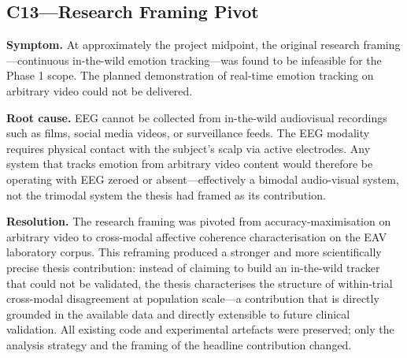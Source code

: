 \subsection*{C13---Research Framing Pivot}
\textbf{Symptom.} At approximately the project midpoint, the original research framing---continuous in-the-wild emotion tracking---was found to be infeasible for the Phase 1 scope. The planned demonstration of real-time emotion tracking on arbitrary video could not be delivered.

\textbf{Root cause.} EEG cannot be collected from in-the-wild audiovisual recordings such as films, social media videos, or surveillance feeds. The EEG modality requires physical contact with the subject's scalp via active electrodes. Any system that tracks emotion from arbitrary video content would therefore be operating with EEG zeroed or absent---effectively a bimodal audio-visual system, not the trimodal system the thesis had framed as its contribution.

\textbf{Resolution.} The research framing was pivoted from accuracy-maximisation on arbitrary video to cross-modal affective coherence characterisation on the EAV laboratory corpus. This reframing produced a stronger and more scientifically precise thesis contribution: instead of claiming to build an in-the-wild tracker that could not be validated, the thesis characterises the structure of within-trial cross-modal disagreement at population scale---a contribution that is directly grounded in the available data and directly extensible to future clinical validation. All existing code and experimental artefacts were preserved; only the analysis strategy and the framing of the headline contribution changed.